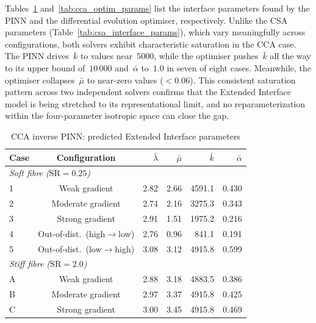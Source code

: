 \documentclass[oneside, 12pt, a4paper, bibliography=totoc]{book}
\begin{document}
Tables~\ref{tab:cca_interface_params} and~\ref{tab:cca_optim_params} list the interface parameters found by the PINN and the differential evolution optimiser, respectively. Unlike the CSA parameters (Table~\ref{tab:csa_interface_params}), which vary meaningfully across configurations, both solvers exhibit characteristic saturation in the CCA case. The PINN drives~$\bar{k}$ to values near~$5000$, while the optimiser pushes~$\bar{k}$ all the way to its upper bound of~$10\,000$ and~$\bar{\alpha}$ to~$1.0$ in seven of eight cases. Meanwhile, the optimiser collapses~$\bar{\mu}$ to near-zero values ($< 0.06$). This consistent saturation pattern across two independent solvers confirms that the Extended Interface model is being stretched to its representational limit, and no reparameterization within the four-parameter isotropic space can close the gap.

\begin{table}[htbp]
\centering
\caption{CCA inverse PINN: predicted Extended Interface parameters}
\label{tab:cca_interface_params}
{\footnotesize
\begin{tabular}{l c r r r r}
\toprule
Case & Configuration & $\bar{\lambda}$ & $\bar{\mu}$ & $\bar{k}$ & $\bar{\alpha}$ \\
\midrule
\multicolumn{6}{l}{\textit{Soft fibre ($\text{SR} = 0.25$)}} \\
1 & Weak gradient     & 2.82 & 2.66 & 4591.1 & 0.430 \\
2 & Moderate gradient  & 2.74 & 2.16 & 3275.3 & 0.343 \\
3 & Strong gradient    & 2.91 & 1.51 & 1975.2 & 0.216 \\
4 & Out-of-dist.\ (high$\to$low) & 2.76 & 0.96 & 841.1 & 0.191 \\
5 & Out-of-dist.\ (low$\to$high) & 3.08 & 3.12 & 4915.8 & 0.599 \\
\midrule
\multicolumn{6}{l}{\textit{Stiff fibre ($\text{SR} = 2.0$)}} \\
A & Weak gradient     & 2.88 & 3.18 & 4883.5 & 0.386 \\
B & Moderate gradient  & 2.97 & 3.37 & 4915.8 & 0.425 \\
C & Strong gradient    & 3.00 & 3.45 & 4915.8 & 0.469 \\
\bottomrule
\end{tabular}
}
\end{table}
\end{document}

